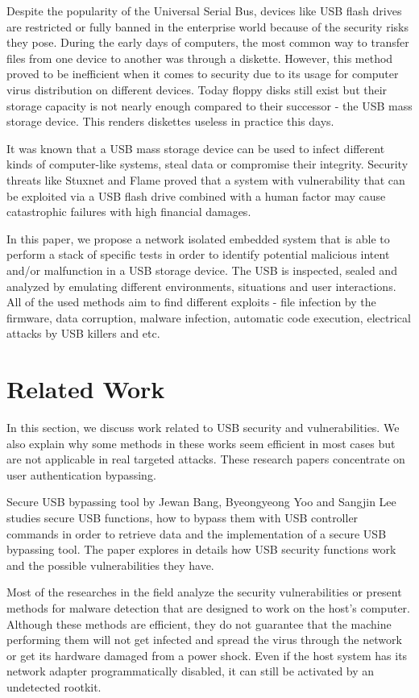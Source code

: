 \documentclass[sigconf]{acmart}
\begin{document}
\par Despite the popularity of the Universal Serial Bus, devices like USB flash drives are restricted or fully banned in the enterprise world because of the security risks they pose. During the early days of computers, the most common way to transfer files from one device to another was through a diskette. However, this method proved to be inefficient when it comes to security due to its usage for computer virus distribution on different devices. Today floppy disks still exist but their storage capacity is not nearly enough compared to their successor - the USB mass storage device. This renders diskettes useless in practice this days.

\par It was known that a USB mass storage device can be used to infect different kinds of computer-like systems, steal data or compromise their integrity. Security threats like Stuxnet\cite{stuxnet} and Flame\cite{flame} proved that a system with vulnerability that can be exploited via a USB flash drive combined with a human factor may cause catastrophic failures with high financial damages.

\par In this paper, we propose a network isolated embedded system that is able to perform a stack of specific tests in order to identify potential malicious intent and/or malfunction in a USB storage device. The USB is inspected, sealed and analyzed by emulating different environments, situations and user interactions. All of the used methods aim to find different exploits - file infection by the firmware, data corruption, malware infection, automatic code execution, electrical attacks by USB killers and etc.

\section{Related Work}
\par \quad In this section, we discuss work related to USB security and vulnerabilities. We also explain why some methods in these works seem efficient in most cases but are not applicable in real targeted attacks. These research papers concentrate on user authentication bypassing.
\par Secure USB bypassing tool \cite{secure_usb_bps} by Jewan Bang, Byeongyeong Yoo and Sangjin Lee studies secure USB functions, how to bypass them with USB controller commands in order to retrieve data and the implementation of a secure USB bypassing tool. The paper explores in details how USB security functions work and the possible vulnerabilities they have.
\par Most of the researches in the field analyze the security vulnerabilities or present methods for malware detection that are designed to work on the host's computer. Although these methods are efficient, they do not guarantee that the machine performing them will not get infected and spread the virus through the network or get its hardware damaged from a power shock. Even if the host system has its network adapter programmatically disabled, it can still be activated by an undetected rootkit.
\end{document}
